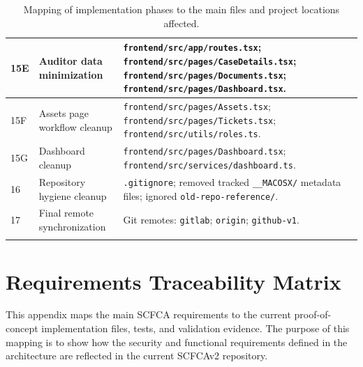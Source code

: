 \documentclass[12pt,a4paper]{report}
\begin{document}
\begin{longtable}{|p{1.5cm}|p{4.8cm}|p{9.8cm}|}
15E & Auditor data minimization &
\texttt{frontend/src/app/routes.tsx}; \texttt{frontend/src/pages/CaseDetails.tsx}; \texttt{frontend/src/pages/Documents.tsx}; \texttt{frontend/src/pages/Dashboard.tsx}. \\
\hline

15F & Assets page workflow cleanup &
\texttt{frontend/src/pages/Assets.tsx}; \texttt{frontend/src/pages/Tickets.tsx}; \texttt{frontend/src/utils/roles.ts}. \\
\hline

15G & Dashboard cleanup &
\texttt{frontend/src/pages/Dashboard.tsx}; \texttt{frontend/src/services/dashboard.ts}. \\
\hline

16 & Repository hygiene cleanup &
\texttt{.gitignore}; removed tracked \texttt{\_\_MACOSX/} metadata files; ignored \texttt{old-repo-reference/}. \\
\hline

17 & Final remote synchronization &
Git remotes: \texttt{gitlab}; \texttt{origin}; \texttt{github-v1}. \\
\hline

\caption{Mapping of implementation phases to the main files and project locations affected.}
\label{tab:phase-file-mapping}
\end{longtable}


\chapter{Requirements Traceability Matrix}

This appendix maps the main SCFCA requirements to the current proof-of-concept implementation files, tests, and validation evidence. 
The purpose of this mapping is to show how the security and functional requirements defined in the architecture are reflected in the current SCFCAv2 repository.

\begingroup
\footnotesize
\setlength{\tabcolsep}{5pt}
\setlength{\extrarowheight}{5pt}
\renewcommand{\arraystretch}{1.45}
\end{document}
